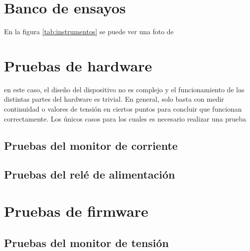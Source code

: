 \section{Banco de ensayos}

En la figura \ref{tab:instrumentos} se puede ver una foto de 



\section{Pruebas de hardware}
\label{sec:pruebasHW}


en este caso, el diseño del dispositivo no es complejo y el funcionamiento de las distintas partes del hardware es trivial. En general, solo basta con medir continuidad o valores de tensión en ciertos puntos para concluir que funcionan correctamente. Los únicos casos para los cuales es necesario realizar una prueba

\subsection{Pruebas del monitor de corriente}



\subsection{Pruebas del relé de alimentación}



\section{Pruebas de firmware}
\label{sec:pruebasFW}



\subsection{Pruebas del monitor de tensión}



